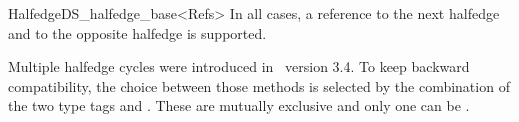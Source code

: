 \begin{ccRefClass}{HalfedgeDS_halfedge_base<Refs>}
In all cases, a reference to the next halfedge and to the opposite
halfedge is supported.


Multiple halfedge cycles were introduced in \cgal\ version 3.4.
To keep backward compatibility, the choice between those methods is selected by the combination 
of the two type tags  and .
These are mutually exclusive and only one can be .


\ccIsModel


\ccCreation
{}


\ccSeeAlso

\\
\\
\\
\\
\\
\\
\\

\end{ccRefClass}

\ccRefPageEnd


